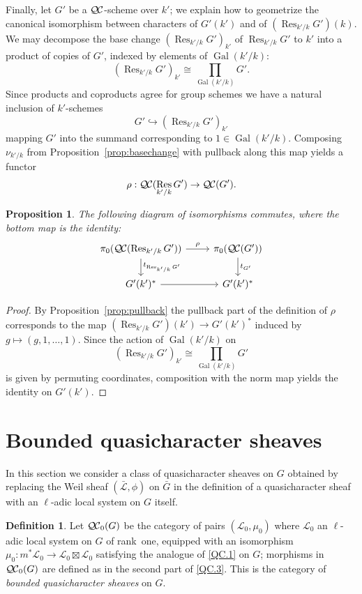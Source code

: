 \documentclass{amsart}
\theoremstyle{plain}
\newtheorem{proposition}[theorem]{Proposition}
\theoremstyle{definition}
\newtheorem{definition}[theorem]{Definition}
\theoremstyle{remark}
\DeclareMathOperator{\Gal}{Gal}
\DeclareMathOperator{\Res}{Res}
\newcommand{\qcs}[1]{{\mathcal{#1}}}
\newcommand{\gqcs}[1]{{\mathcal{\bar #1}}}
\newcommand{\QC}{{\mathcal{Q\hskip-0.8pt C}}}
\newcommand{\QCb}{{\QC_0}}
\newcommand{\QCiso}[1]{\pi_0 (\QC(#1))}
\newcommand{\trFrob}[1]{t_{#1}}
\newcommand{\bG}{\bar{G}}
\begin{document}
Finally, let $G'$ be a $\QC$-scheme over $k'$;
we explain how to geometrize the canonical isomorphism between characters of $G'(k')$ and of $(\Res_{k'/k}G')(k)$.
We may decompose the base change $(\Res_{k'/k}G')_{k'}$ of $\Res_{k'/k}G'$ to $k'$
into a product of copies of $G'$, indexed by elements of $\Gal(k'/k)$:
\[
(\Res_{k'/k}G')_{k'} \cong \prod_{\Gal(k'/k)} G'.
\]
Since products and coproducts agree for group schemes we have a natural inclusion of $k'$-schemes 
\[
G' \hookrightarrow (\Res_{k'/k}G')_{k'}
\]
mapping $G'$ into the summand corresponding to $1 \in \Gal(k'/k)$.  Composing $\nu_{k'/k}$ 
from Proposition~\ref{prop:basechange} with pullback along this map yields a functor
\[
\rho : \QC(\Res_{k'/k}G') \to \QC(G').
\]

\begin{proposition}
The following diagram of isomorphisms commutes, where the bottom map is the identity:
\[
\begin{tikzcd}
\QCiso{\Res_{k'/k} G'} \dar{\trFrob{\Res_{k'/k} G'}} \rar{\rho} & \QCiso{G'} \dar{\trFrob{G'}}\\
G'(k')^* \rar & G'(k')^*
\end{tikzcd}
\]
\end{proposition}
\begin{proof}
By Proposition~\ref{prop:pullback} the pullback part of the definition of $\rho$ corresponds to the map $(\Res_{k'/k}G')(k') \to G'(k')^*$
induced by $g \mapsto (g, 1, \ldots, 1)$.  Since the action of $\Gal(k'/k)$ on 
\[
(\Res_{k'/k}G')_{k'} \cong \prod_{\Gal(k'/k)} G'
\]
is given by permuting coordinates, composition with the norm map yields the identity on $G'(k')$.
\end{proof}

\section{Bounded quasicharacter sheaves}\label{sec:bounded}

In this section we consider a class of quasicharacter sheaves on $G$ obtained by
replacing the Weil sheaf $(\gqcs{L}, \phi)$ on $\bG$ in the definition of a quasicharacter
sheaf with an $\ell$-adic local system on $G$ itself.

\begin{definition}
Let $\QCb(G)$ be the category of pairs $(\qcs{L}_0,\mu_0)$ 
where $\qcs{L}_0$ an $\ell$-adic local system on $G$ of rank~one, 
equipped with an isomorphism $\mu_0 : m^* \qcs{L}_0 \to \qcs{L}_0 \boxtimes \qcs{L}_0$ 
satisfying the analogue of \ref{QC.1} on $G$; 
morphisms in $\QCb(G)$ are defined as in the second part of 
\ref{QC.3}. 
This is the category of \emph{bounded quasicharacter sheaves} on $G$. 
\end{definition}
\end{document}
